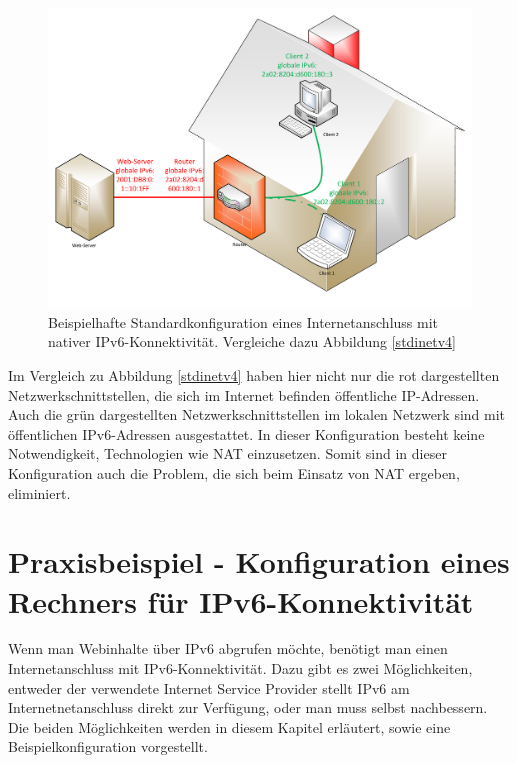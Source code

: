 \documentclass[a4paper,12pt]{scrartcl}
\begin{document}
\begin{figure}[htb]
\begin{center}
 \includegraphics[width=.8\hsize]{./Zeichnungen/IPv6.pdf}
 \end{center}
\caption[Beispielhafte Standardkonfiguration eines Internetanschluss mit nativer IPv6-Konnektivit\"at, Quelle: Autor, verwendete Symbole unterliegen der
GPL]{\label{stdinet}Beispielhafte Standardkonfiguration eines Internetanschluss mit nativer IPv6-Konnektivit\"at. Vergleiche dazu Abbildung \ref{stdinetv4}}
\end{figure}

Im Vergleich zu Abbildung \ref{stdinetv4} haben hier nicht nur die rot dargestellten Netzwerkschnittstellen, die sich im Internet befinden öffentliche IP-Adressen. Auch die grün dargestellten Netzwerkschnittstellen im lokalen Netzwerk sind mit öffentlichen IPv6-Adressen ausgestattet. In dieser Konfiguration besteht keine Notwendigkeit, Technologien wie NAT einzusetzen. Somit sind in dieser Konfiguration auch die Problem, die sich beim Einsatz von NAT ergeben, eliminiert. 

\clearpage
\section{Praxisbeispiel - Konfiguration eines Rechners für IPv6-Konnektivität}
\label{sec:4}
Wenn man  Webinhalte \"uber IPv6 abgrufen m\"ochte, ben\"otigt man einen Internetanschluss mit IPv6-Konnektivit\"at. Dazu gibt es zwei M\"oglichkeiten, entweder der verwendete Internet Service Provider stellt IPv6 am Internetnetanschluss direkt zur Verf\"ugung, oder man muss selbst nachbessern. Die beiden M\"oglichkeiten werden in diesem Kapitel erläutert, sowie eine Beispielkonfiguration vorgestellt.
\end{document}
